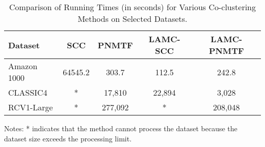 
\begin{table*}[htbp]
    \centering
    \caption{Comparison of Running Times (in seconds) for Various Co-clustering Methods on Selected Datasets.}
    \label{tab:running-time}
    \begin{tabular}{@{} l cccc @{}}
        \toprule
        Dataset     & SCC \cite{dhillon2001CoclusteringDocumentsWords} & PNMTF \cite{chen2023ParallelNonNegativeMatrix} & \textbf{LAMC-SCC} & \textbf{LAMC-PNMTF} \\
        \midrule
        Amazon 1000 & 64545.2                                          & 303.7                                          & 112.5             & 242.8               \\
        CLASSIC4    & *                                                & 17,810                                         & 22,894            & 3,028               \\
        RCV1-Large  & *                                                & 277,092                                        & *                 & 208,048             \\
        \bottomrule
    \end{tabular}
    \begin{tablenotes}
        \small
        \item Notes: * indicates that the method cannot process the dataset because the dataset size exceeds the processing limit.
    \end{tablenotes}
\end{table*}

